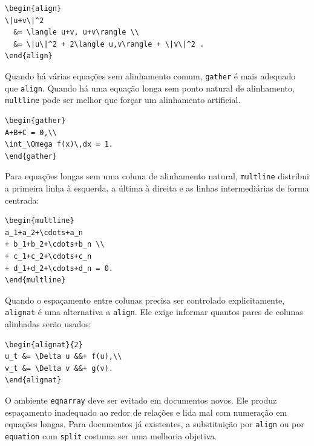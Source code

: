 \begin{lstlisting}[language={[latex]TeX}, caption={Cálculo alinhado}]
\begin{align}
\|u+v\|^2
  &= \langle u+v, u+v\rangle \\
  &= \|u\|^2 + 2\langle u,v\rangle + \|v\|^2 .
\end{align}
\end{lstlisting}

Quando há várias equações sem alinhamento comum, \texttt{gather} é mais adequado que \texttt{align}. Quando há uma equação longa sem ponto natural de alinhamento, \texttt{multline} pode ser melhor que forçar um alinhamento artificial.

\begin{lstlisting}[language={[latex]TeX}, caption={Equações sem alinhamento comum}]
\begin{gather}
A+B+C = 0,\\
\int_\Omega f(x)\,dx = 1.
\end{gather}
\end{lstlisting}

Para equações longas sem uma coluna de alinhamento natural, \texttt{multline} distribui a primeira linha à esquerda, a última à direita e as linhas intermediárias de forma centrada:

\begin{lstlisting}[language={[latex]TeX}, caption={Equação longa sem alinhamento natural}]
\begin{multline}
a_1+a_2+\cdots+a_n
+ b_1+b_2+\cdots+b_n \\
+ c_1+c_2+\cdots+c_n
+ d_1+d_2+\cdots+d_n = 0.
\end{multline}
\end{lstlisting}

Quando o espaçamento entre colunas precisa ser controlado explicitamente, \texttt{alignat} é uma alternativa a \texttt{align}. Ele exige informar quantos pares de colunas alinhadas serão usados:

\begin{lstlisting}[language={[latex]TeX}, caption={Alinhamento com controle de espaçamento}]
\begin{alignat}{2}
u_t &= \Delta u &&+ f(u),\\
v_t &= \Delta v &&+ g(v).
\end{alignat}
\end{lstlisting}

O ambiente \texttt{eqnarray} deve ser evitado em documentos novos. Ele produz espaçamento inadequado ao redor de relações e lida mal com numeração em equações longas. Para documentos já existentes, a substituição por \texttt{align} ou por \texttt{equation} com \texttt{split} costuma ser uma melhoria objetiva.

